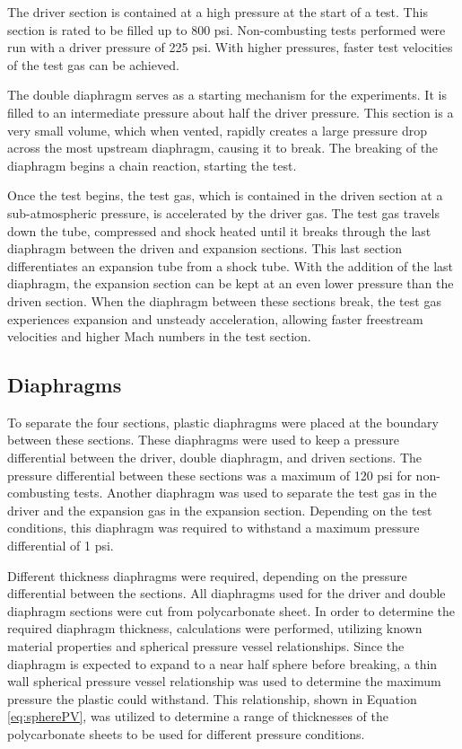 The driver section is contained at a high pressure at the start of a test. This section is rated to be filled up to 800 psi. Non-combusting tests performed were run with a driver pressure of 225 psi. With higher pressures, faster test velocities of the test gas can be achieved. 

The double diaphragm serves as a starting mechanism for the experiments. It is filled to an intermediate pressure about half the driver pressure. This section is a very small volume, which when vented, rapidly creates a large pressure drop across the most upstream diaphragm, causing it to break. The breaking of the diaphragm begins a chain reaction, starting the test. 

Once the test begins, the test gas, which is contained in the driven section at a sub-atmospheric pressure, is accelerated by the driver gas. The test gas travels down the tube, compressed and shock heated until it breaks through the last diaphragm between the driven and expansion sections. This last section differentiates an expansion tube from a shock tube. With the addition of the last diaphragm, the expansion section can be kept at an even lower pressure than the driven section. When the diaphragm between these sections break, the test gas experiences  expansion and unsteady acceleration, allowing faster freestream velocities and higher Mach numbers in the test section. 


\subsection{Diaphragms}
To separate the four sections, plastic diaphragms were placed at the boundary between these sections. These diaphragms were used to keep a pressure differential between the driver, double diaphragm, and driven sections. The pressure differential between these sections was a maximum of 120 psi for non-combusting tests. Another diaphragm was used to separate the test gas in the driver and the expansion gas in the expansion section. Depending on the test conditions, this diaphragm was required to withstand a maximum pressure differential of 1 psi. 

Different thickness diaphragms were required, depending on the pressure differential between the sections. All diaphragms used for the driver and double diaphragm sections were cut from polycarbonate sheet. In order to determine the required diaphragm thickness, calculations were performed, utilizing known material properties and spherical pressure vessel relationships. Since the diaphragm is expected to expand to a near half sphere before breaking, a thin wall spherical pressure vessel relationship was used to determine the maximum pressure the plastic could withstand. This relationship, shown in Equation \ref{eq:spherePV}, was utilized to determine a range of thicknesses of the polycarbonate sheets to be used for different pressure conditions. 

